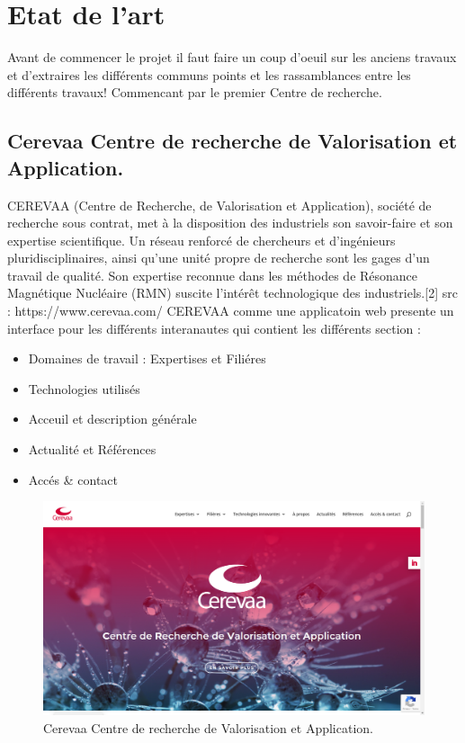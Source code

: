 \documentclass{book}
\begin{document}
\section*{Etat de l'art}
Avant de commencer le projet il faut faire un coup d'oeuil sur les anciens travaux et d'extraires les différents communs points et les rassamblances entre les différents travaux! 
Commencant par le premier Centre de recherche.\\
\subsection*{Cerevaa Centre de recherche de Valorisation et Application.}
CEREVAA (Centre de Recherche, de Valorisation et Application), société de recherche sous contrat, met à la disposition des industriels son savoir-faire et son expertise scientifique. Un réseau renforcé de chercheurs et d’ingénieurs pluridisciplinaires, ainsi qu’une unité propre de recherche sont les gages d’un travail de qualité. Son expertise reconnue dans les méthodes de Résonance Magnétique Nucléaire (RMN) suscite l’intérêt technologique des industriels.[2] src : https://www.cerevaa.com/
CEREVAA comme une applicatoin web presente un interface pour les différents interanautes qui contient les différents section : 
\begin{itemize}
\item Domaines de travail : Expertises et Filiéres
\item Technologies utilisés 
\item Acceuil et description générale
\item Actualité et Références 
\item Accés \& contact
\end{itemize}
\begin{figure}[h]
    \centering
    \includegraphics[width=1\textwidth]{1.png}
    \caption{Cerevaa Centre de recherche de Valorisation et Application.}
    \label{fig:mesh1}
\end{figure}
\newpage
\end{document}
